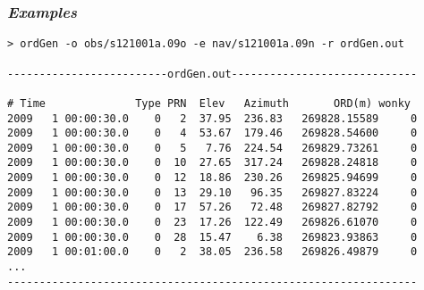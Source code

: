 \begin{\outputsize}
\subsubsection{\emph{Examples}}
\begin{verbatim}
> ordGen -o obs/s121001a.09o -e nav/s121001a.09n -r ordGen.out

-------------------------ordGen.out-----------------------------

# Time              Type PRN  Elev   Azimuth       ORD(m) wonky
2009   1 00:00:30.0    0   2  37.95  236.83   269828.15589     0
2009   1 00:00:30.0    0   4  53.67  179.46   269828.54600     0
2009   1 00:00:30.0    0   5   7.76  224.54   269829.73261     0
2009   1 00:00:30.0    0  10  27.65  317.24   269828.24818     0
2009   1 00:00:30.0    0  12  18.86  230.26   269825.94699     0
2009   1 00:00:30.0    0  13  29.10   96.35   269827.83224     0
2009   1 00:00:30.0    0  17  57.26   72.48   269827.82792     0
2009   1 00:00:30.0    0  23  17.26  122.49   269826.61070     0
2009   1 00:00:30.0    0  28  15.47    6.38   269823.93863     0
2009   1 00:01:00.0    0   2  38.05  236.58   269826.49879     0
...
----------------------------------------------------------------

\end{verbatim}

\end{\outputsize}



